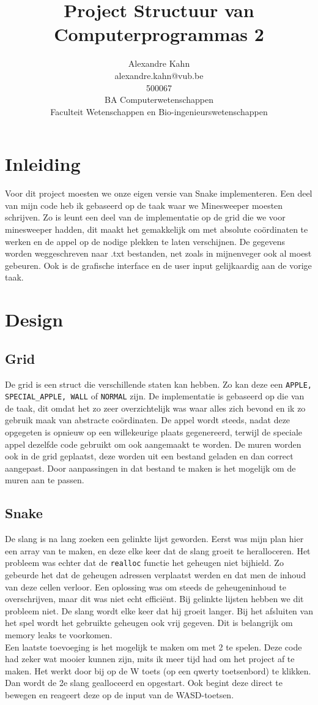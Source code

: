 \documentclass[11pt, oneside]{article}   	%
\title{Project Structuur van Computerprogrammas 2}
\author{Alexandre Kahn \\
			alexandre.kahn@vub.be\\
			500067 \\
			BA Computerwetenschappen \\
			Faculteit Wetenschappen en Bio-ingenieurswetenschappen}
\begin{document}
\maketitle
\tableofcontents
\newpage
\section{Inleiding}  
Voor dit project moesten we onze eigen versie van Snake implementeren. Een deel van mijn code heb ik gebaseerd op de taak waar we Minesweeper moesten schrijven. Zo is leunt een deel van de implementatie op de grid die we voor minesweeper hadden, dit maakt het gemakkelijk om met absolute co\"{o}rdinaten te werken en de appel op de nodige plekken te laten verschijnen. De gegevens worden weggeschreven naar .txt bestanden, net zoals in mijnenveger ook al moest gebeuren. Ook is de grafische interface en de user input gelijkaardig aan de vorige taak. 
\section{Design}
	\subsection{Grid}
	De grid is een struct die verschillende staten kan hebben. Zo kan deze een \texttt{APPLE, SPECIAL\_APPLE, WALL} of \texttt{NORMAL} zijn. De implementatie is gebaseerd op die van de taak, dit omdat het zo zeer overzichtelijk was waar alles zich bevond en ik zo gebruik maak van abstracte co\"{o}rdinaten. De appel wordt steeds, nadat deze opgegeten is opnieuw op een willekeurige plaats gegenereerd, terwijl de speciale appel dezelfde code gebruikt om ook aangemaakt te worden. De muren worden ook in de grid geplaatst, deze worden uit een bestand geladen en dan correct aangepast. Door aanpassingen in dat bestand te maken is het mogelijk om de muren aan te passen. 
	\subsection{Snake}
	De slang is na lang zoeken een gelinkte lijst geworden. Eerst was mijn plan hier een array van te maken, en deze elke keer dat de slang groeit te heralloceren. Het probleem was echter dat de \texttt{realloc} functie het geheugen niet bijhield. Zo gebeurde het dat de geheugen adressen verplaatst werden en dat men de inhoud van deze cellen verloor. Een oplossing was om steeds de geheugeninhoud te overschrijven, maar dit was niet echt effici\"{e}nt. Bij gelinkte lijsten hebben we dit probleem niet. De slang wordt elke keer dat hij groeit langer. Bij het afsluiten van het spel wordt het gebruikte geheugen ook vrij gegeven. Dit is belangrijk om memory leaks te voorkomen. \\
	Een laatste toevoeging is het mogelijk te maken om met 2 te spelen. Deze code had zeker wat mooier kunnen zijn, mits ik meer tijd had om het project af te maken. Het werkt door bij op de W toets (op een qwerty toetsenbord) te klikken. Dan wordt de 2e slang gealloceerd en opgestart. Ook begint deze direct te bewegen en reageert deze op de input van de WASD-toetsen. 
\end{document}

